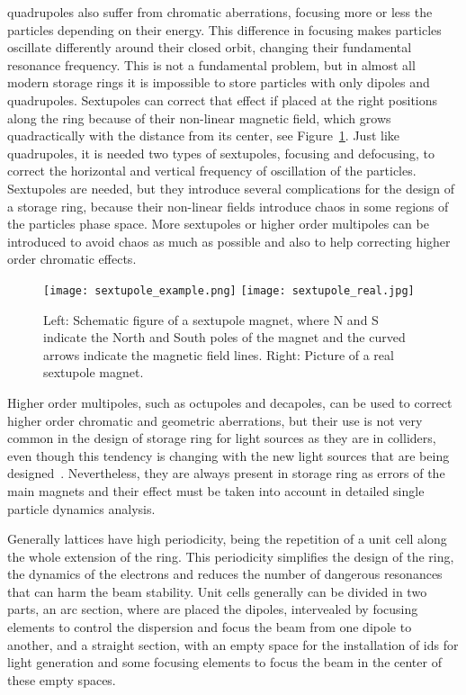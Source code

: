 \begin{description}[align=left]
        \item[Sextupoles:] quadrupoles also suffer from chromatic aberrations, focusing more or less the particles depending on their energy. This difference in focusing makes particles oscillate differently around their closed orbit, changing their fundamental resonance frequency. This is not a fundamental problem, but in almost all modern storage rings it is impossible to store particles with only dipoles and quadrupoles. Sextupoles can correct that effect if placed at the right positions along the ring because of their non-linear magnetic field, which grows quadractically with the distance from its center, see Figure~\ref{fig:sextupole}. Just like quadrupoles, it is needed two types of sextupoles, focusing and defocusing, to correct the horizontal and vertical frequency of oscillation of the particles. Sextupoles are needed, but they introduce several complications for the design of a storage ring, because their non-linear fields introduce chaos in some regions of the particles phase space. More sextupoles or higher order multipoles can be introduced to avoid chaos as much as possible and also to help correcting higher order chromatic effects.
        \begin{figure}[t!]
            \center
            \texttt{[image: sextupole\_example.png]}
            \texttt{[image: sextupole\_real.jpg]}
            \caption[Example of sextupole magnet.]{Left: Schematic figure of a sextupole magnet, where N and S indicate the North and South poles of the magnet and the curved arrows indicate the magnetic field lines. Right: Picture of a real sextupole magnet.}
            \label{fig:sextupole}
        \end{figure}
    \end{description}

    Higher order multipoles, such as octupoles and decapoles, can be used to correct higher order chromatic and geometric aberrations, but their use is not very common in the design of storage ring for light sources as they are in colliders, even though this tendency is changing with the new light sources that are being designed~\cite{maxiv,esrfupgrade}. Nevertheless, they are always present in storage ring as errors of the main magnets and their effect must be taken into account in detailed single particle dynamics analysis.

    Generally lattices have high periodicity, being the repetition of a unit cell along the whole extension of the ring. This periodicity simplifies the design of the ring, the dynamics of the electrons and reduces the number of dangerous resonances that can harm the beam stability. Unit cells generally can be divided in two parts, an arc section, where are placed the dipoles, intervealed by focusing elements to control the dispersion and focus the beam from one dipole to another, and a straight section, with an empty space for the installation of \gls{ids} for light generation and some focusing elements to focus the beam in the center of these empty spaces.

